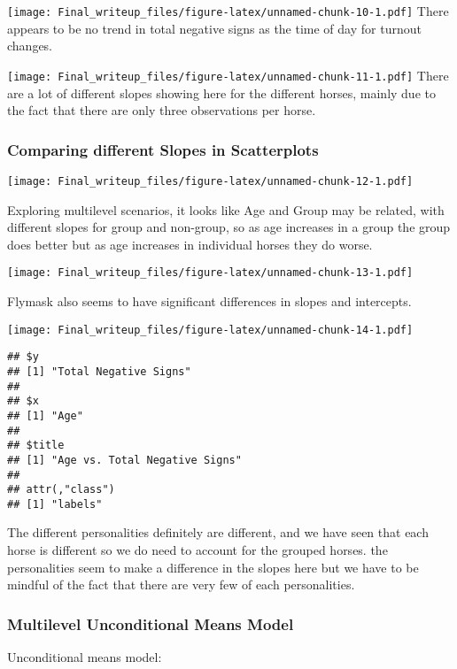 \documentclass[
]{article}
\begin{document}
\texttt{[image: Final\_writeup\_files/figure-latex/unnamed-chunk-10-1.pdf]}
There appears to be no trend in total negative signs as the time of day
for turnout changes.

\texttt{[image: Final\_writeup\_files/figure-latex/unnamed-chunk-11-1.pdf]}
There are a lot of different slopes showing here for the different
horses, mainly due to the fact that there are only three observations
per horse.

\hypertarget{comparing-different-slopes-in-scatterplots}{%
\subsubsection{Comparing different Slopes in
Scatterplots}\label{comparing-different-slopes-in-scatterplots}}

\texttt{[image: Final\_writeup\_files/figure-latex/unnamed-chunk-12-1.pdf]}

Exploring multilevel scenarios, it looks like Age and Group may be
related, with different slopes for group and non-group, so as age
increases in a group the group does better but as age increases in
individual horses they do worse.

\texttt{[image: Final\_writeup\_files/figure-latex/unnamed-chunk-13-1.pdf]}

Flymask also seems to have significant differences in slopes and
intercepts.

\texttt{[image: Final\_writeup\_files/figure-latex/unnamed-chunk-14-1.pdf]}

\begin{verbatim}
## $y
## [1] "Total Negative Signs"
## 
## $x
## [1] "Age"
## 
## $title
## [1] "Age vs. Total Negative Signs"
## 
## attr(,"class")
## [1] "labels"
\end{verbatim}

The different personalities definitely are different, and we have seen
that each horse is different so we do need to account for the grouped
horses. the personalities seem to make a difference in the slopes here
but we have to be mindful of the fact that there are very few of each
personalities.

\hypertarget{multilevel-unconditional-means-model}{%
\subsubsection{Multilevel Unconditional Means
Model}\label{multilevel-unconditional-means-model}}

Unconditional means model:
\end{document}

